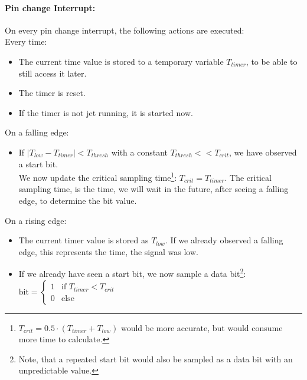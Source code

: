 \documentclass[a4paper]{scrreprt}
\begin{document}
\paragraph{Pin change Interrupt:} On every pin change interrupt, the following actions are executed:\\
Every time:
\begin{itemize}
	\item The current time value is stored to a temporary variable $T_{timer}$, to be able to still access it later.
	\item The timer is reset.
	\item If the timer is not jet running, it is started now.
\end{itemize}
On a falling edge:
\begin{itemize}
	\item If $\left|T_{low} - T_{timer}\right| < T_{thresh}$ with a constant $T_{thresh} << T_{crit}$, we
		have observed a start bit.\\
		We now update the critical sampling time\footnote{$T_{crit} = 0.5\cdot(T_{timer} + T_{low})$ would
		be more accurate, but would consume more time to calculate.}: $T_{crit} = T_{timer}$.
    The critical sampling time, is the time, we will wait in the future, after seeing a falling edge, to determine the bit value.
\end{itemize}
On a rising edge:
\begin{itemize}
	\item The current timer value is stored as $T_{low}$. If we already observed a falling edge, this
		represents the time, the signal was low.
	\item If we already have seen a start bit, we now sample a data bit\footnote{Note, that a repeated
		start bit would also be sampled as a data bit with an unpredictable value.}:\\
	$\mathrm{bit} = \begin{cases} 1 & \text{if } T_{timer}<T_{crit} \\ 0 & \text{else}\end{cases}$
\end{itemize}
\end{document}
